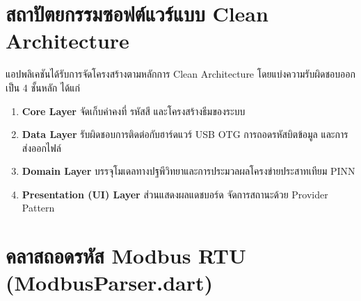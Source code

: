 \section{สถาปัตยกรรมซอฟต์แวร์แบบ Clean Architecture}

แอปพลิเคชันได้รับการจัดโครงสร้างตามหลักการ Clean Architecture โดยแบ่งความรับผิดชอบออกเป็น 4 ชั้นหลัก ได้แก่
\begin{enumerate}
    \item \textbf{Core Layer} จัดเก็บค่าคงที่ รหัสสี และโครงสร้างธีมของระบบ
    \item \textbf{Data Layer} รับผิดชอบการติดต่อกับฮาร์ดแวร์ USB OTG การถอดรหัสบิตข้อมูล และการส่งออกไฟล์
    \item \textbf{Domain Layer} บรรจุโมเดลทางปฐพีวิทยาและการประมวลผลโครงข่ายประสาทเทียม PINN
    \item \textbf{Presentation (UI) Layer} ส่วนแสดงผลแดชบอร์ด จัดการสถานะด้วย Provider Pattern
\end{enumerate}

\section{คลาสถอดรหัส Modbus RTU (ModbusParser.dart)}

